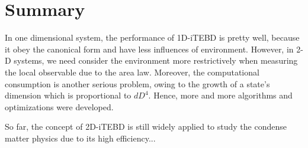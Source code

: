 \chapter{Summary}
\label{chapter:summary}
In one dimensional system, the performance of 1D-iTEBD is pretty well, because it obey the canonical form and have less influences of environment. However, in 2-D systems, we need consider the environment more restrictively when measuring the local observable due to the area law. Moreover, the computational consumption is another serious problem, owing to the growth of a state's dimension which is proportional to $dD^4$. Hence, more and more algorithms and optimizations were developed.

So far, the concept of 2D-iTEBD is still widely applied to study the condense matter physics due to its high efficiency...

